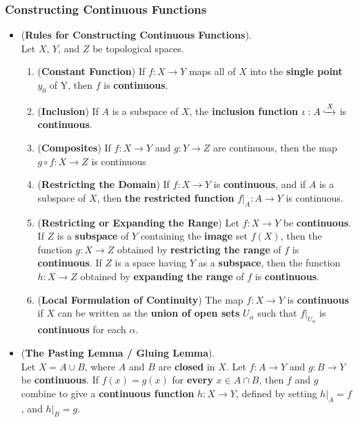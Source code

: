 \documentclass[11pt]{article}
\begin{document}
\subsubsection{Constructing Continuous Functions}
\begin{itemize}
\item \begin{proposition}(\textbf{Rules for Constructing Continuous Functions}). \citep{munkres2000topology}\\
Let $X$, $Y$, and $Z$ be topological spaces.
\begin{enumerate}
\item (\textbf{Constant Function}) If $f : X \rightarrow Y$ maps all of $X$ into the \textbf{single point} $y_0$ of Y, then $f$ is \textbf{continuous}.
\item (\textbf{Inclusion}) If $A$ is a subspace of $X$, the \textbf{inclusion function} $\iota : A \xhookrightarrow X$ is  \textbf{continuous}.
\item (\textbf{Composites}) If $f : X \rightarrow Y$ and $g : Y \rightarrow Z$ are continuous, then the map $g \circ f : X \rightarrow Z$ is continuous
\item (\textbf{Restricting the Domain}) If $f : X \rightarrow Y$ is \textbf{continuous}, and if $A$ is a subspace of $X$, then \textbf{the restricted function} $f|_{A}: A \rightarrow Y$ is continuous.
\item (\textbf{Restricting or Expanding the Range}) Let $f : X \rightarrow Y$ be \textbf{continuous}. If $Z$ is a \textbf{subspace} of $Y$ containing the \textbf{image} set $f(X)$, then the function $g : X \rightarrow Z$ obtained by \textbf{restricting the range} of $f$ is \textbf{continuous}.  If $Z$ is a space having $Y$ as a \textbf{subspace}, then the function $h : X \rightarrow Z$ obtained by \textbf{expanding the range} of $f$ is \textbf{continuous}.
\item (\textbf{Local Formulation of Continuity}) The map  $f : X \rightarrow Y$ is \textbf{continuous} if $X$ can be written as the \textbf{union of open sets} $U_{\alpha}$ such that $f|_{U_{\alpha}}$ is \textbf{continuous} for each $\alpha$.
\end{enumerate}
\end{proposition}

\item \begin{theorem} (\textbf{The Pasting Lemma / Gluing Lemma}). \citep{munkres2000topology} \\ 
Let $X = A \cup B$, where $A$ and $B$ are \textbf{closed} in $X$. Let $f : A \rightarrow Y$ and $g : B \rightarrow Y$ be \textbf{continuous}. If $f(x) = g(x)$ for \textbf{every} $x \in A \cap B$, then $f$ and $g$ combine to give a \textbf{continuous function} $h : X \rightarrow Y$, defined by setting $h|_{A} = f$, and $h|_{B} = g$.
\end{theorem}


\end{itemize}
\end{document}
